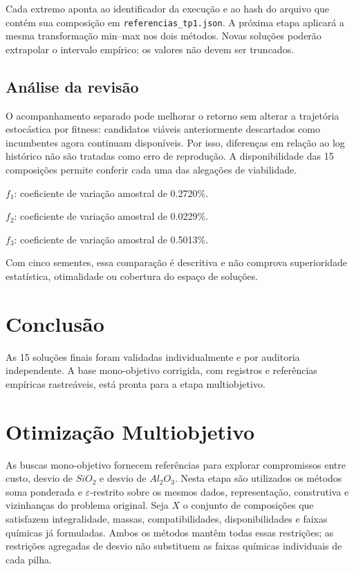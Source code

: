 \documentclass[12pt,a4paper]{article}
\begin{document}
Cada extremo aponta ao identificador da execução e ao hash do arquivo que contém sua composição em \texttt{referencias\_tp1.json}. A próxima etapa aplicará a mesma transformação min--max nos dois métodos. Novas soluções poderão extrapolar o intervalo empírico; os valores não devem ser truncados.

\subsection{Análise da revisão}

O acompanhamento separado pode melhorar o retorno sem alterar a trajetória estocástica por fitness: candidatos viáveis anteriormente descartados como incumbentes agora continuam disponíveis. Por isso, diferenças em relação ao log histórico não são tratadas como erro de reprodução. A disponibilidade das 15 composições permite conferir cada uma das alegações de viabilidade.

$f_1$: coeficiente de variação amostral de \num{0.2720}\%.

$f_2$: coeficiente de variação amostral de \num{0.0229}\%.

$f_3$: coeficiente de variação amostral de \num{0.5013}\%.

Com cinco sementes, essa comparação é descritiva e não comprova superioridade estatística, otimalidade ou cobertura do espaço de soluções.

\section{Conclusão}

As 15 soluções finais foram validadas individualmente e por auditoria independente. A base mono-objetivo corrigida, com registros e referências empíricas rastreáveis, está pronta para a etapa multiobjetivo.




\section{Otimização Multiobjetivo}
\label{sec:multiobjetivo}

As buscas mono-objetivo fornecem referências para explorar compromissos entre
custo, desvio de $SiO_2$ e desvio de $Al_2O_3$. Nesta etapa são utilizados os
métodos soma ponderada e $\varepsilon$-restrito sobre os mesmos dados,
representação, construtiva e vizinhanças do problema original. Seja $X$ o
conjunto de composições que satisfazem integralidade, massas, compatibilidades,
disponibilidades e faixas químicas já formuladas. Ambos os métodos mantêm
todas essas restrições; as restrições agregadas de desvio não substituem as
faixas químicas individuais de cada pilha.
\end{document}
